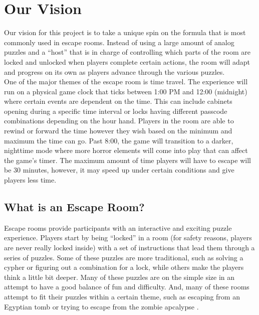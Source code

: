 \documentclass[conference]{IEEEtran}
\begin{document}
\section{Our Vision}
Our vision for this project is to take a unique spin on the formula that is most commonly used in escape rooms.
Instead of using a large amount of analog puzzles and a ``host'' that is in charge of controlling which parts of
the room are locked and unlocked when players complete certain actions, the room will adapt and progress on its
own as players advance through the various puzzles.
\\
\indent One of the major themes of the escape room is time travel. The experience will run
on a physical game clock that ticks between 1:00 PM and 12:00 (midnight) where certain events are
dependent on the time. This can include cabinets opening during a specific time interval or
locks having different passcode combinations depending on the hour hand. Players in the
room are able to rewind or forward the time however they wish based on the minimum and
maximum the time can go. Past 8:00, the game will transition to a darker, nighttime mode where
more horror elements will come into play that can affect the game's timer. The maximum amount 
of time players will have to escape will be 30 minutes, however, it may speed up under
certain conditions and give players less time.

\subsection*{What is an Escape Room?}
Escape rooms provide participants with an interactive and exciting puzzle experience. 
Players start by being ``locked'' in a room (for safety reasons, players are never really
locked inside) with a set of instructions that lead them through a series of puzzles. Some of
these puzzles are more traditional, such as solving a cypher or figuring out a combination for a lock,
while others make the players think a little bit deeper. Many of these puzzles are on the simple size in
an attempt to have a good balance of fun and difficulty. And, many of these rooms attempt to fit their
puzzles within a certain theme, such as escaping from an Egyptian tomb or trying to escape from the zombie
apcalypse \cite{wikipediaEscapeRoom}.
\end{document}
